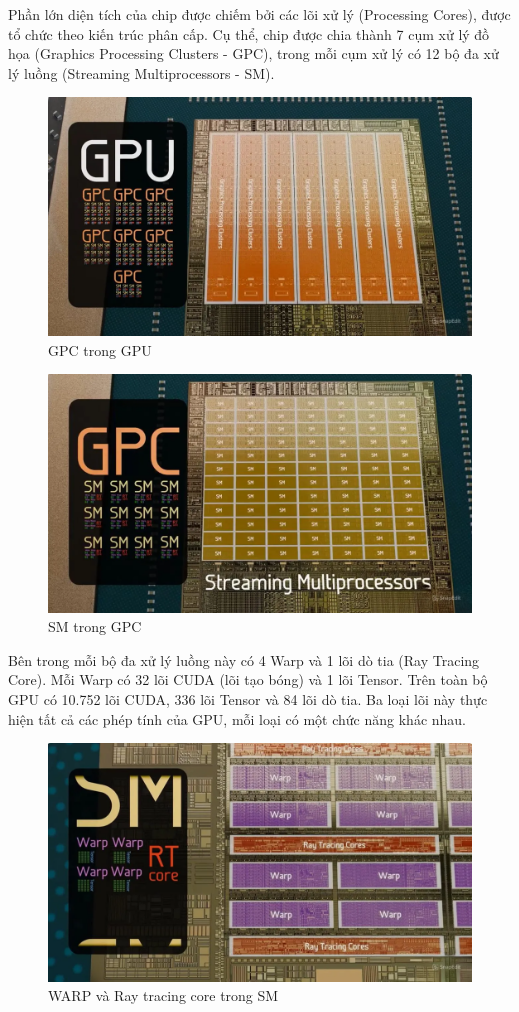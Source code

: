 \documentclass[a4paper]{article}
\begin{document}
Phần lớn diện tích của chip được chiếm bởi các lõi xử lý (Processing Cores), được tổ chức theo kiến trúc phân cấp. Cụ thể, chip được chia thành 7 cụm xử lý đồ họa (Graphics Processing Clusters - GPC), trong mỗi cụm xử lý có 12 bộ đa xử lý luồng (Streaming Multiprocessors - SM).
    
\begin{figure}[H]
    \centering
    \includegraphics[width=0.75\linewidth]{assets/gpu2.png}
    \caption{GPC trong GPU}
    \label{fig:enter-label}
\end{figure}
    
\begin{figure}
    \centering
    \includegraphics[width=0.75\linewidth]{assets/gpu3.png}
    \caption{SM trong GPC}
    \label{fig:enter-label}
\end{figure}
    
Bên trong mỗi bộ đa xử lý luồng này có 4 Warp và 1 lõi dò tia (Ray Tracing Core). Mỗi Warp có 32 lõi CUDA (lõi tạo bóng) và 1 lõi Tensor. Trên toàn bộ GPU có 10.752 lõi CUDA, 336 lõi Tensor và 84 lõi dò tia. Ba loại lõi này thực hiện tất cả các phép tính của GPU, mỗi loại có một chức năng khác nhau.
    
\begin{figure}[H]
    \centering
    \includegraphics[width=0.75\linewidth]{assets/gpu4.png}
    \caption{WARP và Ray tracing core trong SM}
    \label{fig:enter-label}
\end{figure}
    
\end{document}
